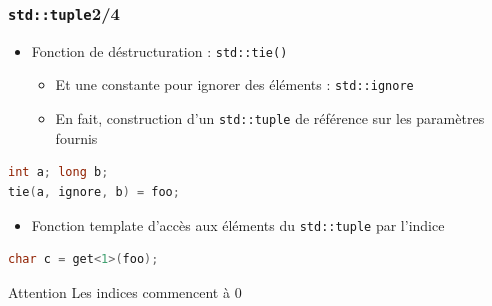 \documentclass[C++.tex]{subfiles}
\begin{document}
\begin{frame}[fragile]
	\frametitle{\lstinline|std::tuple|\titlehfill{}2/4}
	\begin{itemize}
		\item Fonction de déstructuration : \lstinline|std::tie()|
		\begin{itemize}
			\item Et une constante pour ignorer des éléments : \lstinline|std::ignore|
			\item En fait, construction d'un \lstinline|std::tuple| de référence sur les paramètres fournis
		\end{itemize}
	\end{itemize}

	\begin{lstlisting}[language=C++]
int a; long b;
tie(a, ignore, b) = foo;\end{lstlisting}


	\begin{itemize}
		\item Fonction template d'accès aux éléments du \lstinline|std::tuple| par l'indice
	\end{itemize}

	\begin{lstlisting}[language=C++]
char c = get<1>(foo);\end{lstlisting}

	\begin{alertblock}{Attention}
		Les indices commencent à 0
	\end{alertblock}
\end{frame}
\end{document}
